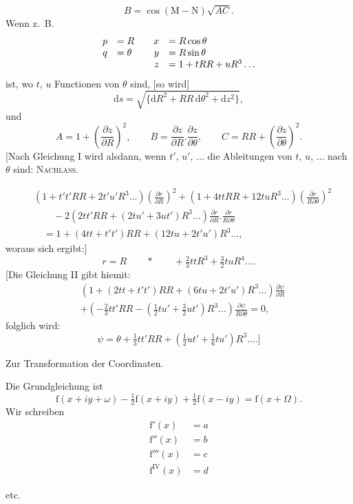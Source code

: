 \[
B=\cos(\mathrm M-\mathrm N)\sqrt{AC}.
\]
Wenn z.~B.
\[
\begin{array}{rl@{\qquad}rl}
p&=R&x&=R\cos\theta\\
q&=\theta&y&=R\sin\theta\\
&&z&=1+tRR+uR^3\ldots
\end{array}
\]
ist, wo $t$, $u$ Functionen von $\theta$ sind, [so wird]
\[
\mathrm ds=\sqrt{\{\mathrm dR^2+RR\,\mathrm d\theta^2+\mathrm dz^2\}},
\]
und
\[
A=1+\left(\frac{\partial z}{\partial R}\right)^2,\qquad
B=\frac{\partial z}{\partial R}.\frac{\partial z}{\partial\theta},\qquad
C=RR+\left(\frac{\partial z}{\partial\theta}\right)^2.
\]
[Nach Gleichung I wird alsdann, wenn $t'$, $u'$, $\ldots$ die Ableitungen von $t$, $u$, $\ldots$ nach $\theta$ sind:
\clearpage
{}\hfill\textsc{Nachlass.}\hfill\mbox{}\par\medskip
\begingroup\small
\[
\begin{aligned}
&(1+t't'RR+2t'u'R^3\ldots)\left(\frac{\partial r}{\partial R}\right)^2
+(1+4ttRR+12tuR^3\ldots)\left(\frac{\partial r}{R\partial\theta}\right)^2\\
&\qquad-2(2tt'RR+(2tu'+3ut')R^3\ldots)\frac{\partial r}{\partial R}.\frac{\partial r}{R\partial\theta}\\
&\quad=1+(4tt+t't')RR+(12tu+2t'u')R^3\ldots,
\end{aligned}
\]
woraus sich ergibt:]
\[
r=R\qquad\ast\qquad+\tfrac23ttR^3+\tfrac32tuR^4\ldots.
\]
[Die Gleichung II gibt hiemit:
\[
\begin{aligned}
&(1+(2tt+t't')RR+(6tu+2t'u')R^3\ldots)\frac{\partial\psi}{\partial R}\\
&+(-\tfrac23tt'RR-(\tfrac12tu'+\tfrac32ut')R^3\ldots)\frac{\partial\psi}{R\partial\theta}=0,
\end{aligned}
\]
folglich wird:
\[
\psi=\theta+\tfrac13tt'RR+(\tfrac12ut'+\tfrac16tu')R^3\ldots.]
\]
\bigskip
\begin{center}
Zur Transformation der Coordinaten.\par\medskip
[18.]
\end{center}
Die Grundgleichung ist
\[
\mathrm f(x+iy+\omega)-\tfrac12\mathrm f(x+iy)+\tfrac12\mathrm f(x-iy)=\mathrm f(x+\Omega).
\]
Wir schreiben
\[
\begin{aligned}
\mathrm f'(x)&=a\\
\mathrm f''(x)&=b\\
\mathrm f'''(x)&=c\\
\mathrm f^{\mathrm{IV}}(x)&=d
\end{aligned}
\]
\begin{center}etc.\end{center}
